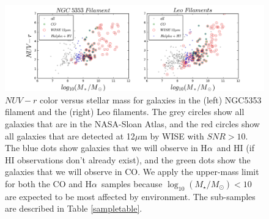 \documentclass[11pt, preprint]{aastex}
\newcommand{\ha}{H$\alpha$}
\newcommand{\sers}{{\it S\'{e}rsic}}
\begin{document}



\begin{figure}[h]
\includegraphics[width=\textwidth]{sample.png}
\caption{\small $NUV-r$ color versus stellar mass for galaxies 
  in the (left) NGC5353 filament and the (right) Leo filaments.
The grey circles show all galaxies that are in the
NASA-Sloan Atlas, and the red circles show all galaxies that are
detected at 12$\mu$m by WISE with $SNR > 10$. 
The blue dots show galaxies that we will observe in \ha \ and HI (if
HI observations don't already exist), and the green
dots show the galaxies that we will observe in CO.  We apply the upper-mass
limit for both the CO and \ha \ samples because
$\log_{10}(M_\star/M_\odot) < 10$ are expected to be most affected by
environment.  The sub-samples are described in Table \ref{sampletable}.}
\label{sample}
\end{figure}
\end{document}
